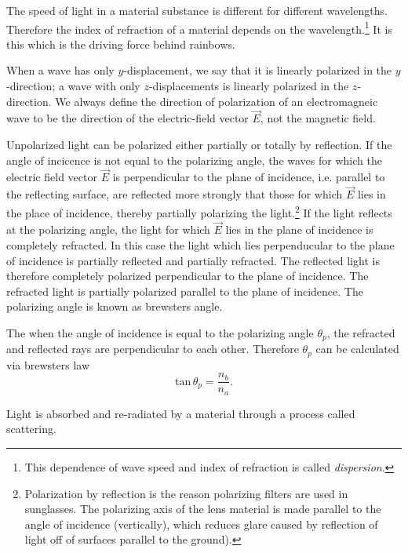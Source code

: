 \documentclass[nobib,notoc]{tufte-handout}
\begin{document}
\begin{rema}
	The speed of light in a material substance is different for different wavelengths. Therefore the index of refraction of a material depends on the wavelength.\footnote{This dependence of wave speed and index of refraction is called \emph{dispersion}.} It is this which is the driving force behind rainbows.
\end{rema}
\begin{defi}[Polarization]
	When a wave has only \(y\)-displacement, we say that it is linearly polarized in the \(y\)-direction; a wave with only \(z\)-displacements is linearly polarized in the \(z\)-direction. We always define the direction of polarization of an electromagneic wave to be the direction of the electric-field vector \(\vec{E}\), not the magnetic field.
\end{defi}
\begin{defi}
	Unpolarized light can be polarized either partially or totally by reflection. If the angle of incicence is not equal to the polarizing angle, the waves for which the electric field vector \(\vec{E}\) is perpendicular to the plane of incidence, i.e. parallel to the reflecting surface, are reflected more strongly that those for which \(\vec{E}\) lies in the place of incidence, thereby partially polarizing the light.\footnote{Polarization by reflection is the reason polarizing filters are used in sunglasses. The polarizing axis of the lens material is made parallel to the angle of incidence (vertically), which reduces glare caused by reflection of light off of surfaces parallel to the ground).} If the light reflects at the polarizing angle, the light for which \(\vec{E}\) lies in the plane of incidence is completely refracted. In this case the light which lies perpenducular to the plane of incidence is partially reflected and partially refracted. The reflected light is therefore completely polarized perpendicular to the plane of incidence. The refracted light is partially polarized parallel to the plane of incidence. The polarizing angle is known as brewsters angle.
\end{defi}
\begin{defi}
	The when the angle of incidence is equal to the polarizing angle \(\theta_p\), the refracted and reflected rays are perpendicular to each other. Therefore \(\theta_p\) can be calculated via brewsters law
	\begin{equation*}
		\text{tan}\,\theta_p=\frac{n_b}{n_a}.
	\end{equation*}
\end{defi}
\begin{defi}[Scattering]
	Light is absorbed and re-radiated by a material through a process called scattering.
\end{defi}
\end{document}
